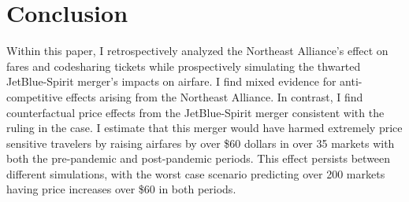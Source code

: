 \documentclass{article}
\begin{document}
    
	\section{Conclusion}
	\label{sec:Conclusion}

    Within this paper, I retrospectively analyzed the Northeast Alliance's effect on fares and codesharing tickets while prospectively simulating the thwarted JetBlue-Spirit merger's impacts on airfare. I find mixed evidence for anti-competitive effects arising from the Northeast Alliance. In contrast, I find counterfactual price effects from the JetBlue-Spirit merger consistent with the ruling in the case. I estimate that this merger would have harmed extremely price sensitive travelers by raising airfares by over \$60 dollars in over 35 markets with both the pre-pandemic and post-pandemic periods. This effect persists between different simulations, with the worst case scenario predicting over 200 markets having price increases over \$60 in both periods. 
	
	\pagebreak 
	 
	
	\FloatBarrier
	
\end{document}
